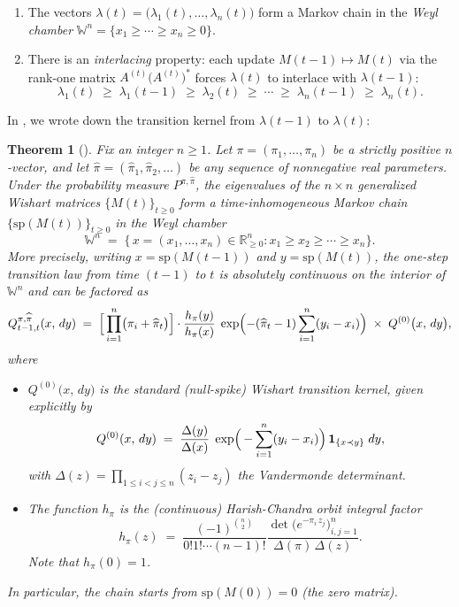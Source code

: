 \documentclass[letterpaper,11pt,oneside,reqno]{book}
\numberwithin{equation}{chapter}  %
\newtheorem{theorem}[proposition]{Theorem}
\theoremstyle{definition}
\begin{document}
\begin{enumerate}
\item The vectors $\lambda(t)=\bigl(\lambda_1(t),\dots,\lambda_n(t)\bigr)$ form a Markov chain in the \emph{Weyl chamber} $\mathbb{W}^n = \{x_1\ge\cdots\ge x_n\ge0\}$.
\item There is an \emph{interlacing} property: each update $M(t-1)\mapsto M(t)$ via the rank-one matrix $A^{(t)}\bigl(A^{(t)}\bigr)^*$ forces $\lambda(t)$ to interlace with $\lambda(t-1)$:
\[
\lambda_1(t)\;\ge\;\lambda_1(t-1)\;\ge\;\lambda_2(t)\;\ge\;\cdots\;\ge\;\lambda_n(t-1)\;\ge\;\lambda_n(t).
\]
\end{enumerate}

In ,
we wrote down the
transition kernel
from $\lambda(t-1)$ to $\lambda(t)$:

\begin{theorem}[\cite{dieker2008largest}]
\label{lecture14:thm:MarkovChain}
Fix an integer \(n\ge1\).  Let \(\pi=(\pi_1,\dots,\pi_n)\) be a strictly positive \(n\)-vector, and let \(\widehat\pi=(\widehat\pi_1,\widehat\pi_2,\dots)\) be any sequence of nonnegative real parameters.  Under the probability measure \(P^{\pi,\widehat\pi}\), the eigenvalues of the \(n\times n\) generalized Wishart matrices \(\{M(t)\}_{t\ge0}\) form a time-inhomogeneous Markov chain \(\{\mathrm{sp}(M(t))\}_{t\ge0}\) in the Weyl chamber
\[
\mathbb{W}^n
\;=\;
\bigl\{\,x=(x_1,\dots,x_n)\in\mathbb{R}^n_{\ge0}:
x_1\ge x_2\ge\cdots\ge x_n\bigr\}.
\]
More precisely, writing \(x=\mathrm{sp}(M(t-1))\) and \(y=\mathrm{sp}(M(t))\), the one-step transition law from time \((t-1)\) to \(t\) is absolutely continuous on the interior of \(\mathbb{W}^n\) and can be factored as
\begin{equation}
\label{lecture14:eq:transition-density}
Q_{t-1,t}^{\pi,\widehat\pi}(x,\,dy)
\;=\;
\Bigl[\,
\prod_{i=1}^n \bigl(\pi_i+\widehat\pi_{t}\bigr)
\Bigr]
\cdot
\frac{h_{\pi}(y)}{h_{\pi}(x)}
\;\exp\Bigl(-(\widehat\pi_{t}-1)\sum_{i=1}^n (y_i - x_i)\Bigr)
\;\times\;Q^{(0)}\bigl(x,\,dy\bigr),
\end{equation}
where
\begin{itemize}
\item \(\displaystyle Q^{(0)}\bigl(x,\,dy\bigr)\) is the \emph{standard} (null-spike) Wishart transition kernel, given explicitly by
	\begin{equation}
		\label{lecture14:eq:Q0}
Q^{(0)}(x,\,dy)
\;=\;
\frac{\Delta(y)}{\Delta(x)}\;\exp\Bigl(\,-\sum_{i=1}^n (y_i - x_i)\Bigr)\,
\mathbf{1}_{\{x\prec y\}}\;dy,
\end{equation}
with \(\Delta(z)=\prod_{1\le i<j\le n}(z_i - z_j)\) the Vandermonde determinant.

\item The function \(h_{\pi}\) is the (continuous) Harish-Chandra orbit integral factor
\[
h_{\pi}(z)
\;=\;
\frac{(-1)^{\binom n2}}{0! 1! \cdots (n-1)! }
\frac{\det\bigl(e^{-\pi_i\,z_j}\bigr)_{i,j=1}^n}{\Delta(\pi)\,\Delta(z)}.
\]
Note that $h_\pi(0)=1$.
\end{itemize}
In particular, the chain starts from \(\mathrm{sp}(M(0))=0\) (the zero matrix).
\end{theorem}
\end{document}
